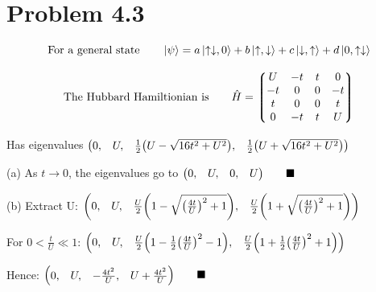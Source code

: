 \documentclass{amsart}
\begin{document}
\section*{Problem 4.3}

\[\text{For a general state}\qquad \ket{\psi}=a\ket{\uparrow\downarrow,0}+b\ket{\uparrow,\downarrow}+c\ket{\downarrow,\uparrow}+d\ket{0,\uparrow\downarrow} \]

\[\text{The Hubbard Hamiltionian is}\qquad \hat{H}=\mqty*(U&-t&t&0 \\-t&0&0&-t \\t&0&0&t \\0&-t&t&U) \]

Has eigenvalues $ \mqty(0,&U,&\frac{1}{2}\qty(U-\sqrt{16t^2+U^2}),&\frac{1}{2}\qty(U+\sqrt{16t^2+U^2})) $

(a) As $t\rightarrow0$, the eigenvalues go to $ \mqty(0,&U,&0,&U) \qquad\blacksquare$

(b) Extract U: $ \mqty(0,&U,&\frac{U}{2}\qty(1-\sqrt{\qty(\frac{4t}{U})^2+1}),&\frac{U}{2}\qty(1+\sqrt{\qty(\frac{4t}{U})^2+1})) $

For $0<\frac{t}{U}\ll 1$:  $ \mqty(0,&U,&\frac{U}{2}\qty(1-\frac{1}{2}\qty(\frac{4t}{U})^2-1),&\frac{U}{2}\qty(1+\frac{1}{2}\qty(\frac{4t}{U})^2+1)) $

Hence: $ \mqty(0,&U,&-\frac{4t^2}{U},&U+\frac{4t^2}{U}) \qquad\blacksquare$
\end{document}
